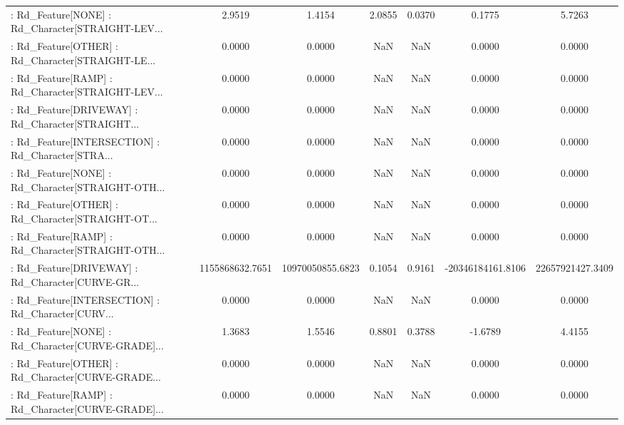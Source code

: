 \begin{longtable}{p{4cm}cccccc}
 : Rd\_Feature[NONE] : Rd\_Character[STRAIGHT-LEV... &            2.9519 &            1.4154 &  2.0855 &       0.0370 &             0.1775 &            5.7263 \\
 : Rd\_Feature[OTHER] : Rd\_Character[STRAIGHT-LE... &            0.0000 &            0.0000 &     NaN &          NaN &             0.0000 &            0.0000 \\
 : Rd\_Feature[RAMP] : Rd\_Character[STRAIGHT-LEV... &            0.0000 &            0.0000 &     NaN &          NaN &             0.0000 &            0.0000 \\
 : Rd\_Feature[DRIVEWAY] : Rd\_Character[STRAIGHT... &            0.0000 &            0.0000 &     NaN &          NaN &             0.0000 &            0.0000 \\
 : Rd\_Feature[INTERSECTION] : Rd\_Character[STRA... &            0.0000 &            0.0000 &     NaN &          NaN &             0.0000 &            0.0000 \\
 : Rd\_Feature[NONE] : Rd\_Character[STRAIGHT-OTH... &            0.0000 &            0.0000 &     NaN &          NaN &             0.0000 &            0.0000 \\
 : Rd\_Feature[OTHER] : Rd\_Character[STRAIGHT-OT... &            0.0000 &            0.0000 &     NaN &          NaN &             0.0000 &            0.0000 \\
 : Rd\_Feature[RAMP] : Rd\_Character[STRAIGHT-OTH... &            0.0000 &            0.0000 &     NaN &          NaN &             0.0000 &            0.0000 \\
 : Rd\_Feature[DRIVEWAY] : Rd\_Character[CURVE-GR... &   1155868632.7651 &  10970050855.6823 &  0.1054 &       0.9161 &  -20346184161.8106 &  22657921427.3409 \\
 : Rd\_Feature[INTERSECTION] : Rd\_Character[CURV... &            0.0000 &            0.0000 &     NaN &          NaN &             0.0000 &            0.0000 \\
 : Rd\_Feature[NONE] : Rd\_Character[CURVE-GRADE]... &            1.3683 &            1.5546 &  0.8801 &       0.3788 &            -1.6789 &            4.4155 \\
 : Rd\_Feature[OTHER] : Rd\_Character[CURVE-GRADE... &            0.0000 &            0.0000 &     NaN &          NaN &             0.0000 &            0.0000 \\
 : Rd\_Feature[RAMP] : Rd\_Character[CURVE-GRADE]... &            0.0000 &            0.0000 &     NaN &          NaN &             0.0000 &            0.0000 \\

\end{longtable}
